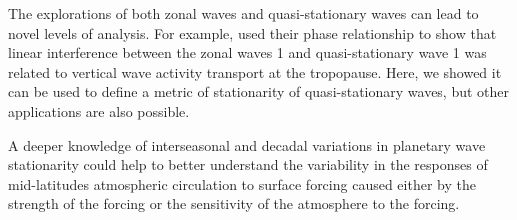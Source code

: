 \documentclass[draft,linenumbers]{agujournal2018}
\begin{document}
The explorations of both zonal waves and quasi-stationary waves can lead
to novel levels of analysis. For example, \citet{smith2012} used their
phase relationship to show that linear interference between the zonal
waves 1 and quasi-stationary wave 1 was related to vertical wave
activity transport at the tropopause. Here, we showed it can be used to
define a metric of stationarity of quasi-stationary waves, but other
applications are also possible.

A deeper knowledge of interseasonal and decadal variations in planetary
wave stationarity could help to better understand the variability in the
responses of mid-latitudes atmospheric circulation to surface forcing
caused either by the strength of the forcing or the sensitivity of the
atmosphere to the forcing.


\end{document}
